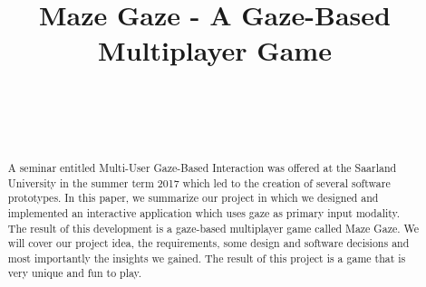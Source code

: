 \documentclass{sigchi}
\def\plaintitle{Maze Gaze - A Gaze-Based Multiplayer Game}
\def\plainkeywords{eye tracking; gaze-based interaction; multi-user interaction; human computer interaction;}
\begin{document}
\title{\plaintitle}

\author{%
  \\
  \\
  \\
}

\maketitle

\begin{abstract}
A seminar entitled Multi-User Gaze-Based Interaction was offered at the Saarland University in the summer term 2017 which led to the creation of several software prototypes.  In this paper, we summarize our project in which we designed and implemented an interactive application which uses gaze as primary input modality. The result of this development is a gaze-based multiplayer game called Maze Gaze. We will cover our project idea, the requirements, some design and software decisions and most importantly the insights we gained. The result of this project is a game that is very unique and fun to play.
\end{abstract}

\end{document}
